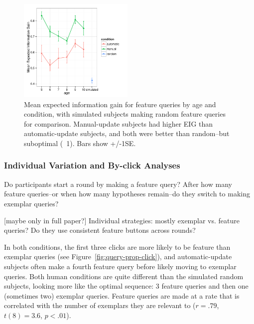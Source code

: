 \documentclass[10pt,letterpaper]{article}
\begin{document}


\begin{figure}[!h]
  \centering
  \includegraphics[width=0.49\textwidth]{figures/EIG_by_age_n_condition}
  \caption{Mean expected information gain for feature queries by age and condition, with simulated subjects making random feature queries for comparison. Manual-update subjects had higher EIG than automatic-update subjects, and both were better than random--but suboptimal (~1). Bars show +/-1SE.}
  \label{fig:EIG_by_age}
\end{figure} 

\subsubsection{Individual Variation and By-click Analyses}

Do participants start a round by making a feature query? After how many feature queries--or when how many hypotheses remain--do they switch to making exemplar queries?

[maybe only in full paper?] 
Individual strategies: mostly exemplar vs. feature queries? Do they use consistent feature buttons across rounds?

In both conditions, the first three clicks are more likely to be feature than exemplar queries (see Figure~\ref{fig:query-prop-click}), and automatic-update subjects often make a fourth feature query before likely moving to exemplar queries. Both human conditions are quite different than the simulated random subjects, looking more like the optimal sequence: 3 feature queries and then one (sometimes two) exemplar queries. Feature queries are made at a rate that is correlated with the number of exemplars they are relevant to ($r=.79$, $t(8)=3.6$, $p<.01$). 
\end{document}
